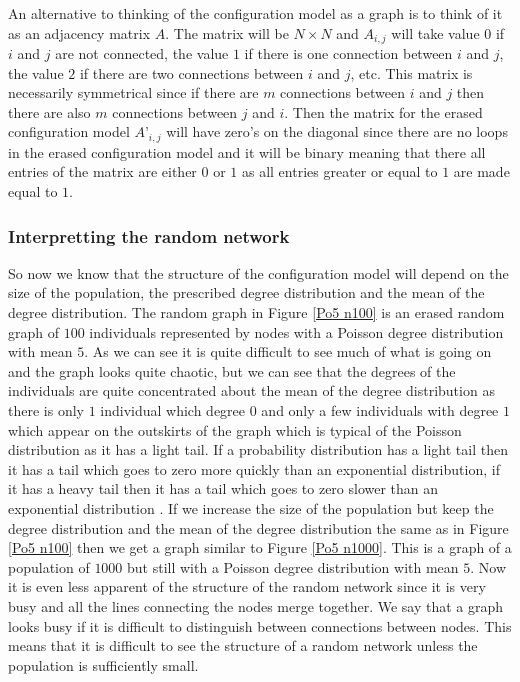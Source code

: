 \documentclass{uonmathsreport}
\begin{document}
An alternative to thinking of the configuration model as a graph is to think of it as an adjacency matrix $A$. The matrix will be $N\times N$ and $A_{i,j}$ will take value $0$ if $i$ and $j$ are not connected, the value $1$ if there is one connection between $i$ and $j$, the value $2$ if there are two connections between $i$ and $j$, etc. This matrix is necessarily symmetrical since if there are $m$ connections between $i$ and $j$ then there are also $m$ connections between $j$ and $i$. Then the matrix for the erased configuration model $A’_{i,j}$ will have zero’s on the diagonal since there are no loops in the erased configuration model and it will be binary meaning that there all entries of the matrix are either $0$ or $1$ as all entries greater or equal to $1$ are made equal to $1$.

\subsubsection{Interpretting the random network} \label{subsub:5.1.3}

So now we know that the structure of the configuration model will depend on the size of the population, the prescribed degree distribution and the mean of the degree distribution. The random graph in Figure \ref{Po5 n100} is an erased random graph of $100$ individuals represented by nodes with a Poisson degree distribution with mean $5$. As we can see it is quite difficult to see much of what is going on and the graph looks quite chaotic, but we can see that the degrees of the individuals are quite concentrated about the mean of the degree distribution as there is only $1$ individual which degree $0$ and only a few individuals with degree $1$ which appear on the outskirts of the graph which is typical of the Poisson distribution as it has a light tail. If a probability distribution has a light tail then it has a tail which goes to zero more quickly than an exponential distribution, if it has a heavy tail then it has a tail which goes to zero slower than an exponential distribution \cite{bibbryson}. If we increase the size of the population but keep the degree distribution and the mean of the degree distribution the same as in Figure \ref{Po5 n100} then we get a graph similar to Figure \ref{Po5 n1000}. This is a graph of a population of $1000$ but still with a Poisson degree distribution with mean $5$. Now it is even less apparent of the structure of the random network since it is very busy and all the lines connecting the nodes merge together. We say that a graph looks busy if it is difficult to distinguish between connections between nodes. This means that it is difficult to see the structure of a random network unless the population is sufficiently small.
\end{document}
